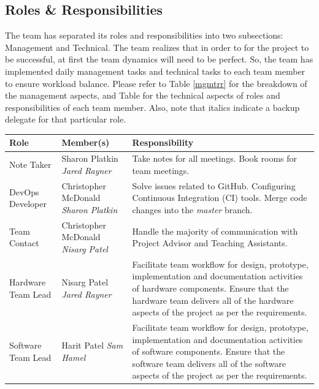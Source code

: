 \documentclass[11pt]{article}
\begin{document}
\subsection{Roles \& Responsibilities}
The team has separated its roles and responsibilities into two subsections: Management and Technical. The team realizes that in order to for the project to be successful, at first the team dynamics will need to be perfect. So, the team has implemented daily management tasks and technical tasks to each team member to ensure workload balance. Please refer to Table \ref{mgmtrr} for the breakdown of the management aspects, and Table for the technical aspects of roles and responsibilities of each team member. Also, note that italics indicate a backup delegate for that particular role.
\begin{table}[H] %
\centering
\begin{tabularx}{\textwidth}{| l | p{4cm} | X |}
\hline
Role & Member(s) & Responsibility \\ \hline
Note Taker & Sharon Platkin \newline \textit{Jared Rayner} & Take notes for all meetings. \newline Book rooms for team meetings.  \\ \hline
DevOps Developer & Christopher McDonald \newline \textit{Sharon Platkin} & Solve issues related to GitHub. \newline Configuring Continuous Integration (CI) tools. \newline Merge code changes into the \textit{master} branch. \\ \hline
Team Contact & Christopher McDonald \newline \textit{Nisarg Patel} & Handle the majority of communication with Project Advisor and Teaching Assistants. \\ \hline
Hardware Team Lead & Nisarg Patel \newline \textit{Jared Rayner} & Facilitate team workflow for design, prototype, implementation and documentation activities of hardware components. \newline Ensure that the hardware team delivers all of the hardware aspects of the project as per the requirements.\\ \hline
Software Team Lead & Harit Patel \newline \textit {Sam Hamel} & Facilitate team workflow for design, prototype, implementation and documentation activities of software components. \newline Ensure that the software team delivers all of the software aspects of the project as per the requirements.\\ \hline

\end{tabularx}
\end{table}
\end{document}
